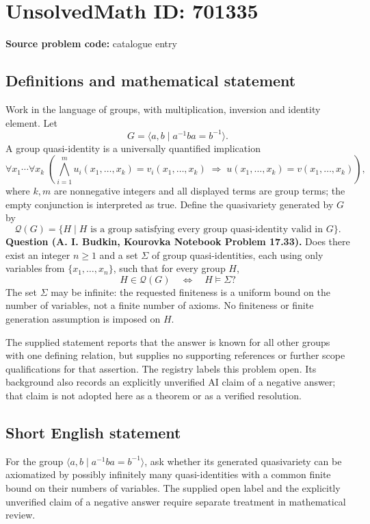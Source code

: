 \documentclass[11pt]{article}
\begin{document}
\section*{UnsolvedMath ID: 701335}
\textbf{Source problem code:} catalogue entry
\subsection{Definitions and mathematical statement}
Work in the language of groups, with multiplication, inversion and identity element. Let
\[
G=\langle a,b\mid a^{-1}ba=b^{-1}\rangle.
\]
A group quasi-identity is a universally quantified implication
\[
\forall x_1\cdots\forall x_k\;\left(\bigwedge_{i=1}^{m}u_i(x_1,\ldots,x_k)=v_i(x_1,\ldots,x_k)\;\Longrightarrow\;u(x_1,\ldots,x_k)=v(x_1,\ldots,x_k)\right),
\]
where \(k,m\) are nonnegative integers and all displayed terms are group terms; the empty conjunction is interpreted as true. Define the quasivariety generated by \(G\) by
\[
\mathcal Q(G)=\{H\mid H\text{ is a group satisfying every group quasi-identity valid in }G\}.
\]
\textbf{Question (A. I. Budkin, Kourovka Notebook Problem 17.33).} Does there exist an integer \(n\geq 1\) and a set \(\Sigma\) of group quasi-identities, each using only variables from \(\{x_1,\ldots,x_n\}\), such that for every group \(H\),
\[
H\in\mathcal Q(G)\quad\Longleftrightarrow\quad H\models\Sigma?
\]
The set \(\Sigma\) may be infinite: the requested finiteness is a uniform bound on the number of variables, not a finite number of axioms. No finiteness or finite generation assumption is imposed on \(H\).

The supplied statement reports that the answer is known for all other groups with one defining relation, but supplies no supporting references or further scope qualifications for that assertion. The registry labels this problem open. Its background also records an explicitly unverified AI claim of a negative answer; that claim is not adopted here as a theorem or as a verified resolution.
\subsection{Short English statement}
For the group \(\langle a,b\mid a^{-1}ba=b^{-1}\rangle\), ask whether its generated quasivariety can be axiomatized by possibly infinitely many quasi-identities with a common finite bound on their numbers of variables. The supplied open label and the explicitly unverified claim of a negative answer require separate treatment in mathematical review.
\end{document}
